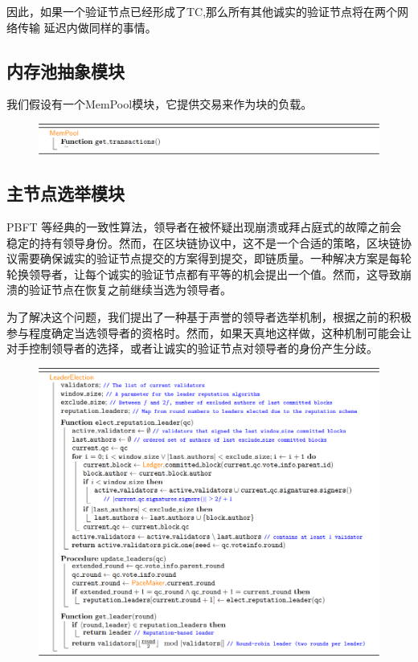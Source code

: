 因此，如果一个验证节点已经形成了TC,那么所有其他诚实的验证节点将在两个网络传输 延迟内做同样的事情。

\subsection{内存池抽象模块}

我们假设有一个MemPool模块，它提供交易来作为块的负载。

\begin{figure}[H]
    \centering
    \includegraphics[width=12cm]{figures/code9.png}
\end{figure}

\subsection{主节点选举模块}

PBFT 等经典的一致性算法，领导者在被怀疑出现崩溃或拜占庭式的故障之前会稳定的持有领导身份。然而，在区块链协议中，这不是一个合适的策略，区块链协议需要确保诚实的验证节点提交的方案得到提交，即链质量。一种解决方案是每轮轮换领导者，让每个诚实的验证节点都有平等的机会提出一个值。然而，这导致崩溃的验证节点在恢复之前继续当选为领导者。

为了解决这个问题，我们提出了一种基于声誉的领导者选举机制，根据之前的积极参与程度确定当选领导者的资格时。然而，如果天真地这样做，这种机制可能会让对手控制领导者的选择，或者让诚实的验证节点对领导者的身份产生分歧。

\begin{figure}[H]
    \centering
    \includegraphics[width=12cm]{figures/code10.png}
\end{figure}

